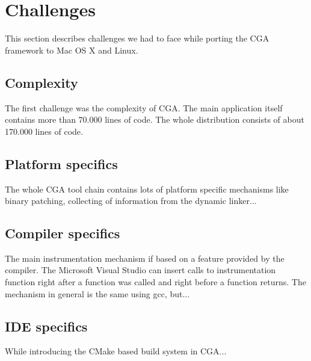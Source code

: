 \section{Challenges} This section describes challenges we had to face while porting the CGA framework to Mac OS X and Linux.

\subsection{Complexity} The first challenge was the complexity of CGA. The main application itself contains more than 70.000 lines of code. The whole distribution consists of about 170.000 lines of code.

\subsection{Platform specifics} The whole CGA tool chain contains lots of platform specific mechanisms like binary patching, collecting of information from the dynamic linker... 

\subsection{Compiler specifics} The main instrumentation mechanism if based on a feature provided by the compiler. The Microsoft Visual Studio can insert calls to instrumentation function right after a function was called and right before a function returns. The mechanism in general is the same using gcc, but...

\subsection{IDE specifics} While introducing the CMake based build system in CGA...
